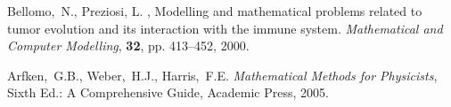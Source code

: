 
\begin{thebibliography}{999}


 Bellomo,~N., Preziosi, L. , Modelling and mathematical problems
related to tumor evolution and its interaction with the immune
system. \textit{Mathematical and Computer Modelling}, \textbf{32},  pp. 413--452, 2000.

 Arfken,~G.B., Weber,~H.J., Harris,~F.E. \textit{Mathematical Methods for Physicists}, Sixth Ed.: A Comprehensive Guide, Academic Press, 2005.


\end{thebibliography}
